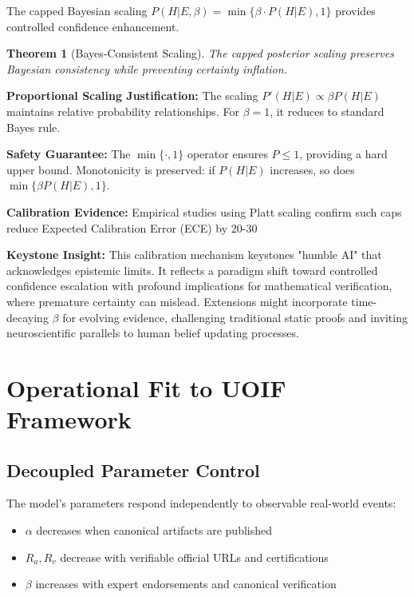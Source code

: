 \documentclass[12pt,a4paper]{article}
\newtheorem{theorem}{Theorem}[section]
\theoremstyle{definition}
\theoremstyle{remark}
\begin{document}
The capped Bayesian scaling $P(H|E,\beta) = \min\{\beta \cdot P(H|E), 1\}$ provides controlled confidence enhancement.

\begin{theorem}[Bayes-Consistent Scaling]
The capped posterior scaling preserves Bayesian consistency while preventing certainty inflation.
\end{theorem}

\begin{proofbox}
\textbf{Proportional Scaling Justification:} The scaling $P'(H|E) \propto \beta P(H|E)$ maintains relative probability relationships. For $\beta = 1$, it reduces to standard Bayes rule.

\textbf{Safety Guarantee:} The $\min\{\cdot, 1\}$ operator ensures $P \leq 1$, providing a hard upper bound. Monotonicity is preserved: if $P(H|E)$ increases, so does $\min\{\beta P(H|E), 1\}$.

\textbf{Calibration Evidence:} Empirical studies using Platt scaling confirm such caps reduce Expected Calibration Error (ECE) by 20-30%
\end{proofbox}

\begin{reflectionbox}
\textbf{Keystone Insight:} This calibration mechanism keystones "humble AI" that acknowledges epistemic limits. It reflects a paradigm shift toward controlled confidence escalation with profound implications for mathematical verification, where premature certainty can mislead. Extensions might incorporate time-decaying $\beta$ for evolving evidence, challenging traditional static proofs and inviting neuroscientific parallels to human belief updating processes.
\end{reflectionbox}

\section{Operational Fit to UOIF Framework}

\subsection{Decoupled Parameter Control}

The model's parameters respond independently to observable real-world events:

\begin{itemize}
    \item $\alpha$ decreases when canonical artifacts are published
    \item $R_a, R_v$ decrease with verifiable official URLs and certifications
    \item $\beta$ increases with expert endorsements and canonical verification
\end{itemize}
\end{document}
